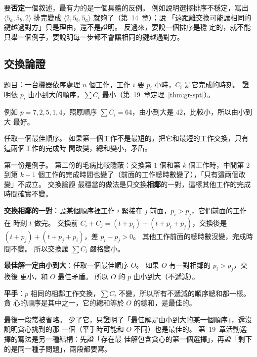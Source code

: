 要\textbf{否定}一個敘述，最有力的是一個具體的反例。 例如說明選擇排序不穩定，寫出
$\langle 5_a, 5_b, 2 \rangle$ 排完變成 $\langle 2, 5_b, 5_a \rangle$ 就夠了（第~14~章）；說
「遠距離交換可能讓相同的鍵越過對方」只是理由，還不是證明。 反過來，要說一個排序\textbf{是}穩
定的，就不能只舉一個例子，要說明每一步都不會讓相同的鍵越過對方。

\subsection{交換論證}

題目：一台機器依序處理 $n$ 個工作，工作 $i$ 要 $p_i$ 小時，$C_i$ 是它完成的時刻。 證明依
$p_i$ 由小到大的順序，$\sum C_i$ 最小（第~19~章定理~\ref{thm:gr-spt}）。

\begin{exmbad}[只舉例子]
例如 $p = 7, 2, 5, 1, 4$，照原順序 $\sum C_i = 64$，由小到大是 $42$，比較小，所以由小到大
最好。
\end{exmbad}

\begin{exmbad}[交換不相鄰的兩個工作]
任取一個最佳順序。 如果第一個工作不是最短的，把它和最短的工作交換，只有這兩個工作的完成時
間改變，總和變小，矛盾。
\end{exmbad}

第一份是例子。 第二份的毛病比較隱蔽：交換第 $1$ 個和第 $k$ 個工作時，中間第 $2$ 到第
$k - 1$ 個工作的完成時間也變了（前面的工作總時數變了），「只有這兩個改變」不成立。 交換論證
最穩當的做法是只交換\textbf{相鄰}的一對，這樣其他工作的完成時間確實不變。

\begin{exmgood}
\textbf{交換相鄰的一對}：設某個順序裡工作 $i$ 緊接在 $j$ 前面，$p_i > p_j$，它們前面的工作在
時刻 $t$ 做完。 交換前 $C_i + C_j = (t + p_i) + (t + p_i + p_j)$，交換後是
$(t + p_j) + (t + p_j + p_i)$，差 $p_i - p_j > 0$。 其他工作前面的總時數沒變，完成時間不變。
所以交換讓 $\sum C_i$ 嚴格變小。

\textbf{最佳解一定由小到大}：任取一個最佳順序 $O$。 如果 $O$ 有一對相鄰的 $p_i > p_j$，交換後
更小，和 $O$ 最佳矛盾。 所以 $O$ 的 $p$ 由小到大（不遞減）。

\textbf{平手}：$p$ 相同的相鄰工作交換，$\sum C_i$ 不變，所以所有不遞減的順序總和都一樣。 貪
心的順序是其中之一，它的總和等於 $O$ 的總和，是最佳的。
\end{exmgood}

最後一段常被省略。 少了它，只證明了「最佳解是由小到大的某一個順序」，還沒說明貪心挑到的那
一個（平手時可能和 $O$ 不同）也是最佳的。 第~19~章活動選擇的寫法是另一種結構：先證「存在最
佳解包含貪心的第一個選擇」，再證「剩下的是同一種子問題」，兩段都要寫。

